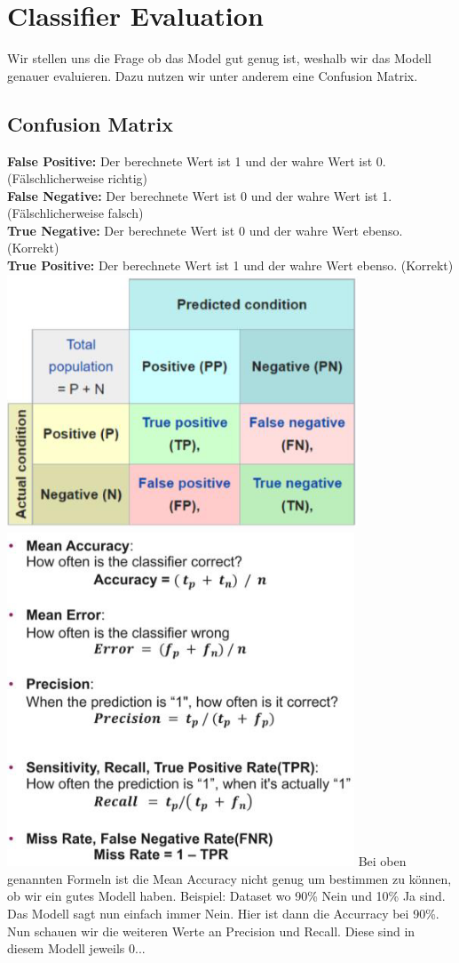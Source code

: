 \section{Classifier Evaluation}
Wir stellen uns die Frage ob das Model gut genug ist, weshalb wir das Modell genauer evaluieren. Dazu nutzen wir unter anderem eine Confusion Matrix.
\subsection{Confusion Matrix}
\textbf{False Positive:} Der berechnete Wert ist 1 und der wahre Wert ist 0. (Fälschlicherweise richtig)\\
\textbf{False Negative:} Der berechnete Wert ist 0 und der wahre Wert ist 1. (Fälschlicherweise falsch)\\
\textbf{True Negative:} Der berechnete Wert ist 0 und der wahre Wert ebenso. (Korrekt)\\
\textbf{True Positive:} Der berechnete Wert ist 1 und der wahre Wert ebenso. (Korrekt)\\
\includegraphics[width=0.8\linewidth]{img/confusion_matrix.png}
\includegraphics[width=0.8\linewidth]{img/confusion_matrix_description.png}
Bei oben genannten Formeln ist die Mean Accuracy nicht genug um bestimmen zu können, ob wir ein gutes Modell haben. Beispiel: Dataset wo 90\% Nein und 10\% Ja sind. Das Modell sagt nun einfach immer Nein. Hier ist dann die Accurracy bei 90\%. Nun schauen wir die weiteren Werte an Precision und Recall. Diese sind in diesem Modell jeweils 0...

